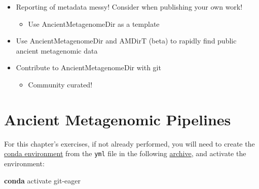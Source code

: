 \documentclass[
  letterpaper,
]{book}
\newenvironment{Shaded}{}{}
\newcommand{\ExtensionTok}[1]{\textcolor[rgb]{0.84,0.23,0.29}{\textbf{#1}}}
\newcommand{\NormalTok}[1]{\textcolor[rgb]{0.14,0.16,0.18}{#1}}
\providecommand{\tightlist}{%
  \setlength{\itemsep}{0pt}\setlength{\parskip}{0pt}}\usepackage{longtable,booktabs,array}
\begin{document}
\begin{itemize}
\tightlist
\item
  Reporting of metadata messy! Consider when publishing your own work!

  \begin{itemize}
  \tightlist
  \item
    Use AncientMetagenomeDir as a template
  \end{itemize}
\item
  Use AncientMetagenomeDir and AMDirT (beta) to rapidly find public
  ancient metagenomic data
\item
  Contribute to AncientMetagenomeDir with git

  \begin{itemize}
  \tightlist
  \item
    Community curated!
  \end{itemize}
\end{itemize}

\hypertarget{ancient-metagenomic-pipelines-1}{%
\chapter{Ancient Metagenomic
Pipelines}\label{ancient-metagenomic-pipelines-1}}

\begin{tcolorbox}[enhanced jigsaw, opacitybacktitle=0.6, bottomtitle=1mm, opacityback=0, colback=white, coltitle=black, leftrule=.75mm, toprule=.15mm, title=\textcolor{quarto-callout-tip-color}{\faLightbulb}\hspace{0.5em}{Tip}, colframe=quarto-callout-tip-color-frame, toptitle=1mm, arc=.35mm, left=2mm, titlerule=0mm, breakable, rightrule=.15mm, bottomrule=.15mm, colbacktitle=quarto-callout-tip-color!10!white]

For this chapter's exercises, if not already performed, you will need to
create the \protect\hyperlink{creating-a-conda-environment}{conda
environment} from the \texttt{yml} file in the following
\href{https://doi.org/10.5281/zenodo.6983136}{archive}, and activate the
environment:

\begin{Shaded}
\begin{Highlighting}[]
\ExtensionTok{conda}\NormalTok{ activate git{-}eager}
\end{Highlighting}
\end{Shaded}

\end{tcolorbox}
\end{document}
